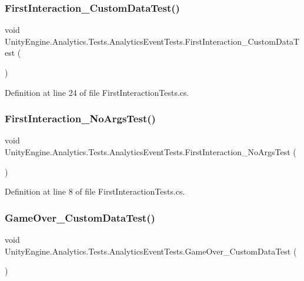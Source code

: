 \subsubsection{\texorpdfstring{FirstInteraction\_CustomDataTest()}{FirstInteraction\_CustomDataTest()}}
{\footnotesize\ttfamily void Unity\+Engine.\+Analytics.\+Tests.\+Analytics\+Event\+Tests.\+First\+Interaction\+\_\+\+Custom\+Data\+Test (\begin{DoxyParamCaption}{ }\end{DoxyParamCaption})}



Definition at line 24 of file First\+Interaction\+Tests.\+cs.

\mbox{\label{class_unity_engine_1_1_analytics_1_1_tests_1_1_analytics_event_tests_ac1e723538e90a9231caff88116f5c3ea}} 
\subsubsection{\texorpdfstring{FirstInteraction\_NoArgsTest()}{FirstInteraction\_NoArgsTest()}}
{\footnotesize\ttfamily void Unity\+Engine.\+Analytics.\+Tests.\+Analytics\+Event\+Tests.\+First\+Interaction\+\_\+\+No\+Args\+Test (\begin{DoxyParamCaption}{ }\end{DoxyParamCaption})}



Definition at line 8 of file First\+Interaction\+Tests.\+cs.

\mbox{\label{class_unity_engine_1_1_analytics_1_1_tests_1_1_analytics_event_tests_aa27f69ff00f8c401b343e47d0e478c77}} 
\subsubsection{\texorpdfstring{GameOver\_CustomDataTest()}{GameOver\_CustomDataTest()}}
{\footnotesize\ttfamily void Unity\+Engine.\+Analytics.\+Tests.\+Analytics\+Event\+Tests.\+Game\+Over\+\_\+\+Custom\+Data\+Test (\begin{DoxyParamCaption}{ }\end{DoxyParamCaption})}



